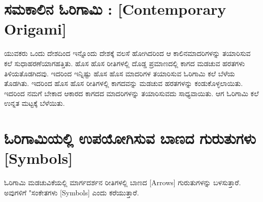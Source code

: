 
\section*{ಸಮಕಾಲಿನ ಓರಿಗಾಮಿ : [Contemporary Origami]}
ಯುವಕರು ಒಂದು ದೇಶದಿಂದ ಇನ್ನೊಂದು ದೇಶಕ್ಕೆ ವಲಸೆ ಹೋಗಿದರಿಂದ ಆ ಕಾಲಿನ\break ಮಾದರಿಗಳನ್ನು ತಯಾರಿಸುವ ಕಲೆ ಸುಧಾಹರಣೆಯಾಗಹತ್ತಿತು. ಹೊಸ ಹೊಸ ರೀತಿಗಳಲ್ಲಿ ದೊಡ್ಡ ಪ್ರಮಾಣದಲ್ಲಿ ಕಾಗದ ಮಡಚುವ ಹರತಗಳು ತಿಳಿಯತೊಡಗಿದವು. ಇದರಿಂದ ಇನ್ನಿಷ್ಟು ಹೊಸ ಹೊಸ  ಮಾದರಿಗಳ ತಯಾರಿಸುವ ಓರಿಗಾಮಿ ಕಲೆ ಬೆಳೆಯ ತೊಡಗಿತು. ಇದರಿಂದ ಹೊಸ ಹೊಸ ರೀತಿಗಳಲ್ಲಿ ಕಾಗದವನ್ನು ಮಡಚುವ ಹರತಗಳನ್ನು ಕಂಡುಕೊಳ್ಳಲಾಯಿತು. ಇದರಿಂದ ನಮಗೆ ಬೇಕಾದ ಆಕಾರದ ಕಾಗದದ ಮಾದರಿಗಳನ್ನು ತಯಾರಿಸುವದು ಸಾಧ್ಯ\break ವಾಯಿತು. ಆಗ ಓರಿಗಾಮಿ ಕಲೆ ಉನ್ನತ ಮಟ್ಟಕ್ಕೆ ಬೆಳೆಯಿತು. 


\section{ಓರಿಗಾಮಿಯಲ್ಲಿ ಉಪಯೋಗಿಸುವ ಬಾಣದ ಗುರುತುಗಳು [Symbols]}\label{sec1.3}%
ಓರಿಗಾಮಿ ಮಡಚುವಿಕೆಯಲ್ಲಿ ಮಾರ್ಗದರ್ಶನ ರೀತಿಗಳಲ್ಲಿ ಬಾಣದ [Arrows] ಗುರುತು\break ಗಳನ್ನು ಬಳಸುತ್ತಾರೆ. ಅವುಗಳಿಗೆ "ಸಂಕೇತಗಳು [Symbols] ಎಂದು ಕರೆಯುತ್ತಾರೆ. 

\medskip

